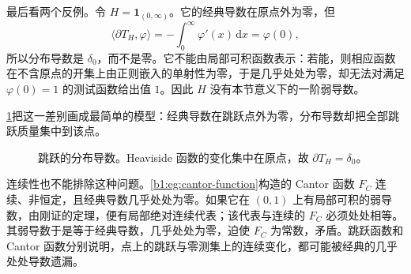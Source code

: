 \ProseParagraphBreak

最后看两个反例。令 \(H=\mathbf1_{(0,\infty)}\)。它的经典导数在原点外为零，但
\[
 \langle\partial T_H,\varphi\rangle
 =-\int_0^\infty\varphi'(x)\,\mathrm dx
 =\varphi(0),
\]
所以分布导数是 \(\delta_0\)，而不是零。它不能由局部可积函数表示：若能，则相应函数在不含原点的开集上由正则嵌入的单射性为零，于是几乎处处为零，却无法对满足 \(\varphi(0)=1\) 的测试函数给出值 \(1\)。因此 \(H\) 没有本节意义下的一阶弱导数。

\ProseParagraphBreak

\cref{b1:fig:jump-distributional-derivative}把这一差别画成最简单的模型：经典导数在跳跃点外为零，分布导数却把全部跳跃质量集中到该点。
\begin{figure}[htbp]
  \centering
  \caption[跳跃的分布导数]{跳跃的分布导数。Heaviside 函数的变化集中在原点，故 \(\partial T_H=\delta_0\)。}
  \label{b1:fig:jump-distributional-derivative}
\end{figure}

连续性也不能排除这种问题。\cref{b1:eg:cantor-function}构造的 Cantor 函数 \(F_C\) 连续、非恒定，且经典导数几乎处处为零。如果它在 \((0,1)\) 上有局部可积的弱导数，由刚证的定理，便有局部绝对连续代表；该代表与连续的 \(F_C\) 必须处处相等。其弱导数于是等于经典导数，几乎处处为零，迫使 \(F_C\) 为常数，矛盾。跳跃函数和 Cantor 函数分别说明，点上的跳跃与零测集上的连续变化，都可能被经典的几乎处处导数遗漏。
